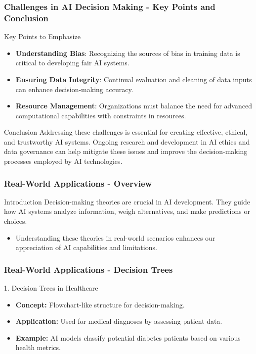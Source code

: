 \documentclass[aspectratio=169]{beamer}
\begin{document}
\begin{frame}[fragile]
    \frametitle{Challenges in AI Decision Making - Key Points and Conclusion}
    \begin{block}{Key Points to Emphasize}
        \begin{itemize}
            \item \textbf{Understanding Bias}: Recognizing the sources of bias in training data is critical to developing fair AI systems.
            \item \textbf{Ensuring Data Integrity}: Continual evaluation and cleaning of data inputs can enhance decision-making accuracy.
            \item \textbf{Resource Management}: Organizations must balance the need for advanced computational capabilities with constraints in resources.
        \end{itemize}
    \end{block}

    \begin{block}{Conclusion}
        Addressing these challenges is essential for creating effective, ethical, and trustworthy AI systems. Ongoing research and development in AI ethics and data governance can help mitigate these issues and improve the decision-making processes employed by AI technologies.
    \end{block}
\end{frame}

\begin{frame}[fragile]
    \frametitle{Real-World Applications - Overview}
    \begin{block}{Introduction}
        Decision-making theories are crucial in AI development. They guide how AI systems analyze information, weigh alternatives, and make predictions or choices.
    \end{block}
    \begin{itemize}
        \item Understanding these theories in real-world scenarios enhances our appreciation of AI capabilities and limitations.
    \end{itemize}
\end{frame}

\begin{frame}[fragile]
    \frametitle{Real-World Applications - Decision Trees}
    \begin{block}{1. Decision Trees in Healthcare}
        \begin{itemize}
            \item \textbf{Concept:} Flowchart-like structure for decision-making.
            \item \textbf{Application:} Used for medical diagnoses by assessing patient data.
            \item \textbf{Example:} AI models classify potential diabetes patients based on various health metrics.
        \end{itemize}
    \end{block}
\end{frame}
\end{document}
